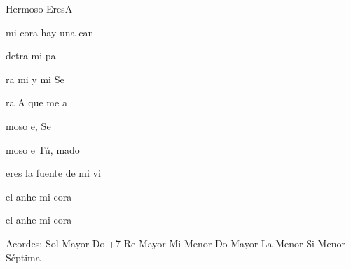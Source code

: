 \documentclass[12pt, spanish]{book}
\begin{document}
\begin{song}{Hermoso Eres}{A}
        \begin{SBExtraKeys}{

            \begin{SBOpGroup}
                 mi cora hay una can

                 detra mi pa

                ra mi  y mi Se~

                ra A que me a
            \end{SBOpGroup}

            \begin{SBChorus}
                moso e,  Se

                moso e Tú, mado 

                 eres la fuente de mi vi

                 el anhe  mi cora

                 el anhe  mi cora
            \end{SBChorus}



            \ifChordBk
            \begin{SBOpGroup}
                Acordes:
                \upchord{\G}\qquad Sol Mayor \hfill
                \upchord{\CMaj}\qquad Do +7 \hfill\null\break
                \upchord{\D}\qquad Re Mayor \hfill
                \upchord{\Em}\qquad Mi Menor \hfill\null\break
                \upchord{\C}\qquad Do Mayor  \hfill
                \upchord{\Am}\qquad La Menor \hfill\null\break
                \upchord{\Bmseven}\qquad Si Menor S\'eptima \hfill\null\break
            \end{SBOpGroup}
            \fi
        }\end{SBExtraKeys}

    \end{song}
\end{document}
